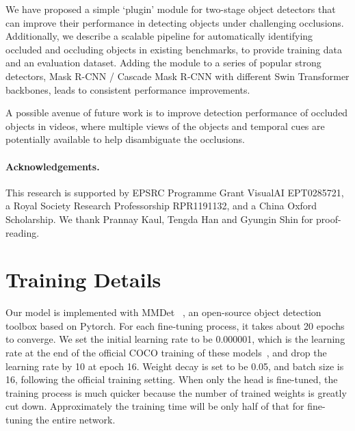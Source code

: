 \documentclass{bmvc2k}
\begin{document}
We have proposed a simple `plugin' module for two-stage object detectors that can improve their performance in detecting objects under challenging occlusions. 
Additionally, we describe a scalable pipeline for automatically identifying occluded and occluding objects in existing benchmarks, to provide training data and an evaluation dataset. Adding the module to a series of popular strong detectors, Mask R-CNN / Cascade Mask R-CNN with different Swin Transformer backbones, leads to consistent performance improvements.

A possible avenue of future work is to improve detection performance of occluded objects in videos, where multiple views of the objects and temporal cues are potentially  available to help disambiguate the occlusions. 
\paragraph{Acknowledgements. } 
This research is supported by EPSRC Programme Grant VisualAI EPT0285721, a Royal Society
Research Professorship RPR1191132, and a China Oxford Scholarship. 
We thank Prannay Kaul, Tengda Han and Gyungin Shin for proof-reading.



\clearpage

\appendix
\vspace{6mm}
\renewcommand{\appendixpagename}{\color{bmvc_blue} Appendix}
\appendixpage
\addappheadtotoc


\vspace{6mm}



\section{Training Details}
\label{sec:training_details}
Our model is implemented with MMDet
~\cite{mmdetection}, an open-source object detection toolbox based on Pytorch. For each fine-tuning process, it takes about 20 epochs to converge. We set the initial learning rate to be 0.000001, which is the learning rate at the end of the official COCO training of these models~\cite{swin_object_detection_github}, and drop the learning rate by 10 at epoch 16. Weight decay is set to be 0.05, and batch size is 16, following the official training setting. When only the head is fine-tuned, the training process is much quicker because the number of trained weights is greatly cut down. Approximately the training time will be only half of that for fine-tuning the entire network.
\end{document}
